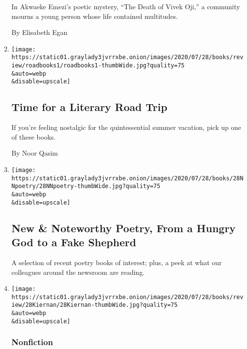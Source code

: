 \begin{enumerate}
  In Akwaeke Emezi's poetic mystery, ``The Death of Vivek Oji,'' a
  community mourns a young person whose life contained multitudes.

  By Elisabeth Egan
\item
  \href{/2020/07/28/books/time-for-a-literary-road-trip.html}{}

  \texttt{[image: https://static01.graylady3jvrrxbe.onion/images/2020/07/28/books/review/roadbooks1/roadbooks1-thumbWide.jpg?quality=75\\\&auto=webp\\\&disable=upscale]}

  \hypertarget{time-for-a-literary-road-trip}{%
  \subsection{Time for a Literary Road
  Trip}\label{time-for-a-literary-road-trip}}

  If you're feeling nostalgic for the quintessential summer vacation,
  pick up one of these books.

  By Noor Qasim
\item
  \href{/2020/07/28/books/review/new-this-week.html}{}

  \texttt{[image: https://static01.graylady3jvrrxbe.onion/images/2020/07/28/books/28NNpoetry/28NNpoetry-thumbWide.jpg?quality=75\\\&auto=webp\\\&disable=upscale]}

  \hypertarget{new--noteworthy-poetry-from-a-hungry-god-to-a-fake-shepherd}{%
  \subsection{New \& Noteworthy Poetry, From a Hungry God to a Fake
  Shepherd}\label{new--noteworthy-poetry-from-a-hungry-god-to-a-fake-shepherd}}

  A selection of recent poetry books of interest; plus, a peek at what
  our colleagues around the newsroom are reading.
\item
  \href{/2020/07/28/books/review/the-apocalypse-factory-steve-olson.html}{}

  \texttt{[image: https://static01.graylady3jvrrxbe.onion/images/2020/07/28/books/review/28Kiernan/28Kiernan-thumbWide.jpg?quality=75\\\&auto=webp\\\&disable=upscale]}

  \hypertarget{nonfiction-2}{%
  \subsubsection{Nonfiction}\label{nonfiction-2}}

  \hypertarget{a-forgotten-town-at-the-center-of-the-manhattan-project}{%
}
\end{enumerate}
